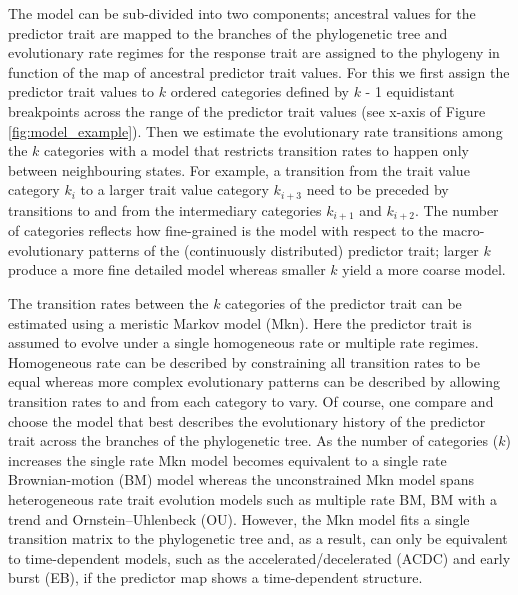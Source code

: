 The model can be sub-divided into two components; ancestral values for the predictor trait are mapped to the branches of the phylogenetic tree and evolutionary rate regimes for the response trait are assigned to the phylogeny in function of the map of ancestral predictor trait values. For this we first assign the predictor trait values to $\mathit{k}$ ordered categories defined by $\mathit{k}$ - 1 equidistant breakpoints across the range of the predictor trait values (see x-axis of Figure \ref{fig:model_example}). Then we estimate the evolutionary rate transitions among the $\mathit{k}$ categories with a model that restricts transition rates to happen only between neighbouring states. For example, a transition from the trait value category $\mathit{k_{i}}$ to a larger trait value category $\mathit{k_{i+3}}$ need to be preceded by transitions to and from the intermediary categories $\mathit{k_{i+1}}$ and $\mathit{k_{i+2}}$. The number of categories reflects how fine-grained is the model with respect to the macro-evolutionary patterns of the (continuously distributed) predictor trait; larger $\mathit{k}$ produce a more fine detailed model whereas smaller $\mathit{k}$ yield a more coarse model.

The transition rates between the $\mathit{k}$ categories of the predictor trait can be estimated using a meristic Markov model (Mkn). Here the predictor trait is assumed to evolve under a single homogeneous rate or multiple rate regimes. Homogeneous rate can be described by constraining all transition rates to be equal whereas more complex evolutionary patterns can be described by allowing transition rates to and from each category to vary. Of course, one compare and choose the model that best describes the evolutionary history of the predictor trait across the branches of the phylogenetic tree. As the number of categories ($\mathit{k}$) increases the single rate Mkn model becomes equivalent to a single rate Brownian-motion (BM) model whereas the unconstrained Mkn model spans heterogeneous rate trait evolution models such as multiple rate BM, BM with a trend and Ornstein–Uhlenbeck (OU). However, the Mkn model fits a single transition matrix to the phylogenetic tree and, as a result, can only be equivalent to time-dependent models, such as the accelerated/decelerated (ACDC) and early burst (EB), if the predictor map shows a time-dependent structure.

